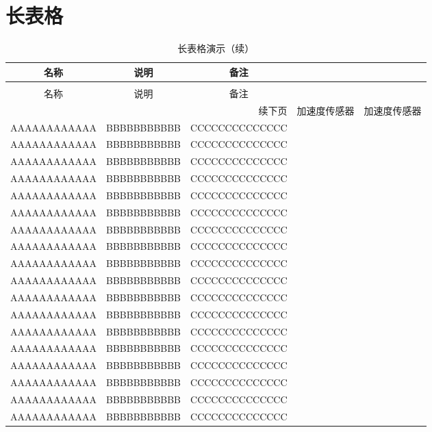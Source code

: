 \section{长表格}
\begin{longtable}{ccc}
\caption[长表格演示]{长表格演示} \label{tab:longtable1} \\
\toprule[1.5pt]
名称  & 说明 & 备注\\
\midrule[1pt]
\endfirsthead
\caption[]{长表格演示（续）} \\
\toprule[1.5pt]
名称  & 说明 & 备注 \\
\midrule[1pt]
\endhead
\hline
\multicolumn{3}{r}{\small 续下页}
\endfoot
\bottomrule[1.5pt]
\endlastfoot

加速度传感器   &   加速度传感器   &   加速度传感器   \\
AAAAAAAAAAAA   &   BBBBBBBBBBB   &   CCCCCCCCCCCCCC   \\
AAAAAAAAAAAA   &   BBBBBBBBBBB   &   CCCCCCCCCCCCCC   \\
AAAAAAAAAAAA   &   BBBBBBBBBBB   &   CCCCCCCCCCCCCC   \\
AAAAAAAAAAAA   &   BBBBBBBBBBB   &   CCCCCCCCCCCCCC   \\
AAAAAAAAAAAA   &   BBBBBBBBBBB   &   CCCCCCCCCCCCCC   \\
AAAAAAAAAAAA   &   BBBBBBBBBBB   &   CCCCCCCCCCCCCC   \\
AAAAAAAAAAAA   &   BBBBBBBBBBB   &   CCCCCCCCCCCCCC   \\
AAAAAAAAAAAA   &   BBBBBBBBBBB   &   CCCCCCCCCCCCCC   \\
AAAAAAAAAAAA   &   BBBBBBBBBBB   &   CCCCCCCCCCCCCC   \\
AAAAAAAAAAAA   &   BBBBBBBBBBB   &   CCCCCCCCCCCCCC   \\
AAAAAAAAAAAA   &   BBBBBBBBBBB   &   CCCCCCCCCCCCCC   \\
AAAAAAAAAAAA   &   BBBBBBBBBBB   &   CCCCCCCCCCCCCC   \\
AAAAAAAAAAAA   &   BBBBBBBBBBB   &   CCCCCCCCCCCCCC   \\
AAAAAAAAAAAA   &   BBBBBBBBBBB   &   CCCCCCCCCCCCCC   \\
AAAAAAAAAAAA   &   BBBBBBBBBBB   &   CCCCCCCCCCCCCC   \\
AAAAAAAAAAAA   &   BBBBBBBBBBB   &   CCCCCCCCCCCCCC   \\
AAAAAAAAAAAA   &   BBBBBBBBBBB   &   CCCCCCCCCCCCCC   \\
AAAAAAAAAAAA   &   BBBBBBBBBBB   &   CCCCCCCCCCCCCC   \\

\end{longtable}
